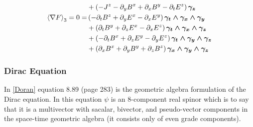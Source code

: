 \documentclass[letterpaper,10pt,english]{sphinxmanual}
\begin{document}
\begin{align*}
  & +\left ( - J^{z} - \partial_{y} B^{x} + \partial_{x} B^{y} - \partial_{t} E^{z}\right ) \boldsymbol{\gamma_{z}} \\
  \left < {\nabla F} \right >_{3} = 0 =  & \left ( - \partial_{t} B^{z} + \partial_{y} E^{x} - \partial_{x} E^{y}\right ) \boldsymbol{\gamma_{t}\wedge \gamma_{x}\wedge \gamma_{y}} \\
  & +\left ( \partial_{t} B^{y} + \partial_{z} E^{x} - \partial_{x} E^{z}\right ) \boldsymbol{\gamma_{t}\wedge \gamma_{x}\wedge \gamma_{z}} \\
  & +\left ( - \partial_{t} B^{x} + \partial_{z} E^{y} - \partial_{y} E^{z}\right ) \boldsymbol{\gamma_{t}\wedge \gamma_{y}\wedge \gamma_{z}} \\
  & +\left ( \partial_{x} B^{x} + \partial_{y} B^{y} + \partial_{z} B^{z}\right ) \boldsymbol{\gamma_{x}\wedge \gamma_{y}\wedge \gamma_{z}}
  \end{align*}

\subsubsection{Dirac Equation}
\label{GA:dirac-equation}
In {\hyperref[GA:doran]{{[}Doran{]}}} equation 8.89 (page 283) is the geometric algebra formulation of the Dirac equation.  In this equation
$\psi$ is an 8-component real spinor which is to say that it is a multivector with sacalar, bivector, and
pseudo-vector components in the space-time geometric algebra (it consists only of even grade components).
\end{document}
